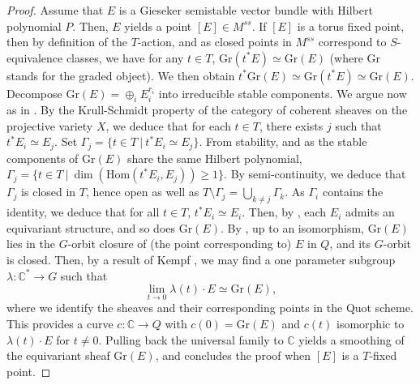 \documentclass[a4paper,10pt]{amsart}
\theoremstyle{plain}{
    \newtheorem{theorem}{Theorem}[section]
    \newtheorem{lemma}[theorem]{Lemma}
    \newtheorem{corollary}[theorem]{Corollary}
    \newtheorem{proposition}[theorem]{Proposition}
    \newtheorem{conjecture}[theorem]{Conjecture}
}
\theoremstyle{definition}{
    \newtheorem{definition}[theorem]{Definition}
    \newtheorem{defn-thm}[theorem]{Definition-Theorem}
    \newtheorem{example}[theorem]{Example}
    \newtheorem{notation}[theorem]{Notation}
}
\theoremstyle{remark}{
    \newtheorem{remark}[theorem]{Remark}
    \newtheorem{problem}[theorem]{Problem}
    \newtheorem{question}[theorem]{Question}
}
\def\C{\mathbb{C}}
\def\Hom{\mathrm{Hom}}
\def\Gr{\mathrm{Gr}}
\begin{document}
\begin{proof}
 Assume that $E$ is a Gieseker semistable vector bundle with Hilbert polynomial $P$. Then, $E$ yields a point $[E]\in M^{ss}$. If $[E]$ is a torus fixed point, then by definition of the $T$-action, and as closed points in $M^{ss}$ correspond to $S$-equivalence classes, we have for any $t\in T$, $\Gr(t^*E)\simeq \Gr(E)$ (where $\Gr$ stands for the graded object). We then obtain $t^*\Gr(E)\simeq\Gr(t^*E)\simeq \Gr(E)$. Decompose $\Gr(E)=\oplus_i E_i^{r_i}$ into irreducible stable components. We argue now as in \cite[Proposition 3.19]{Koo11}. By the Krull-Schmidt property of the category of coherent sheaves on the projective variety $X$, we deduce that for each $t\in T$, there exists $j$ such that $t^* E_i\simeq E_j$. Set $\Gamma_j=\lbrace t\in T\:\vert\: t^*E_i\simeq E_j\rbrace$. From stability, and as the stable components of $\Gr(E)$ share the same Hilbert polynomial, $\Gamma_j=\lbrace t\in T\:\vert\: \dim(\Hom(t^*E_i,E_j))\geq 1 \rbrace$. By semi-continuity, we deduce that $\Gamma_j$ is closed in $T$, hence open as well as $T\setminus \Gamma_j=\bigcup_{k\neq j} \Gamma_k$. As $\Gamma_i$ contains the identity, we deduce that for all $t\in T$, $t^*E_i \simeq E_i$. Then, by \cite[Propositions 4.2 and 4.4]{Koo11}, each $E_i$ admits an equivariant structure, and so does $\Gr(E)$. By \cite[theorem 4.3.3]{HuLe}, up to an isomorphism, $\Gr(E)$ lies in the $G$-orbit closure of (the point corresponding to) $E$ in $Q$, and its $G$-orbit is closed. Then, by a result of Kempf \cite[Theorem 1.4]{Kempf78}, we may find a one parameter subgroup $\lambda :\C^*\to G$ such that
  $$
 \lim_{t\to 0} \lambda(t)\cdot E\simeq \Gr(E),
 $$
 where we identify the sheaves and their corresponding points in the Quot scheme. This provides a curve $c:\C\to Q$ with $c(0)=\Gr(E)$ and $c(t)$ isomorphic to $\lambda(t)\cdot E$ for $t\neq 0$. Pulling back the universal family to $\C$ yields a smoothing of the equivariant sheaf $\Gr(E)$, and concludes the proof when $[E]$ is a $T$-fixed point.


\end{proof}
\end{document}
